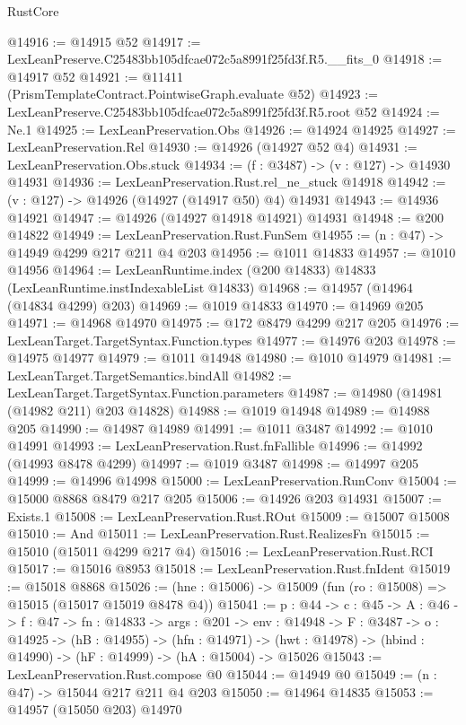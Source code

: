 \begin{lexlean}{RustCore}
\begin{coremodule}
@14916 := @14915 @52
@14917 := LexLeanPreserve.C25483bb105dfcae072c5a8991f25fd3f.R5.__fits_0
@14918 := @14917 @52
@14921 := @11411 (PrismTemplateContract.PointwiseGraph.evaluate @52)
@14923 := LexLeanPreserve.C25483bb105dfcae072c5a8991f25fd3f.R5.root @52
@14924 := Ne.{1}
@14925 := LexLeanPreservation.Obs
@14926 := @14924 @14925
@14927 := LexLeanPreservation.Rel
@14930 := @14926 (@14927 @52 @4)
@14931 := LexLeanPreservation.Obs.stuck
@14934 := (f : @3487) -> (v : @127) -> @14930 @14931
@14936 := LexLeanPreservation.Rust.rel_ne_stuck @14918
@14942 := (v : @127) -> @14926 (@14927 (@14917 @50) @4) @14931
@14943 := @14936 @14921
@14947 := @14926 (@14927 @14918 @14921) @14931
@14948 := @200 @14822
@14949 := LexLeanPreservation.Rust.FunSem
@14955 := (n : @47) -> @14949 @4299 @217 @211 @4 @203
@14956 := @1011 @14833
@14957 := @1010 @14956
@14964 := LexLeanRuntime.index (@200 @14833) @14833 (LexLeanRuntime.instIndexableList @14833)
@14968 := @14957 (@14964 (@14834 @4299) @203)
@14969 := @1019 @14833
@14970 := @14969 @205
@14971 := @14968 @14970
@14975 := @172 @8479 @4299 @217 @205
@14976 := LexLeanTarget.TargetSyntax.Function.types
@14977 := @14976 @203
@14978 := @14975 @14977
@14979 := @1011 @14948
@14980 := @1010 @14979
@14981 := LexLeanTarget.TargetSemantics.bindAll
@14982 := LexLeanTarget.TargetSyntax.Function.parameters
@14987 := @14980 (@14981 (@14982 @211) @203 @14828)
@14988 := @1019 @14948
@14989 := @14988 @205
@14990 := @14987 @14989
@14991 := @1011 @3487
@14992 := @1010 @14991
@14993 := LexLeanPreservation.Rust.fnFallible
@14996 := @14992 (@14993 @8478 @4299)
@14997 := @1019 @3487
@14998 := @14997 @205
@14999 := @14996 @14998
@15000 := LexLeanPreservation.RunConv
@15004 := @15000 @8868 @8479 @217 @205
@15006 := @14926 @203 @14931
@15007 := Exists.{1}
@15008 := LexLeanPreservation.Rust.ROut
@15009 := @15007 @15008
@15010 := And
@15011 := LexLeanPreservation.Rust.RealizesFn
@15015 := @15010 (@15011 @4299 @217 @4)
@15016 := LexLeanPreservation.Rust.RCI
@15017 := @15016 @8953
@15018 := LexLeanPreservation.Rust.fnIdent
@15019 := @15018 @8868
@15026 := (hne : @15006) -> @15009 (fun (ro : @15008) => @15015 (@15017 @15019 @8478 @4))
@15041 := {p : @44} ->
  {c : @45} ->
  {A : @46} ->
  {f : @47} ->
  {fn : @14833} ->
  {args : @201} ->
  {env : @14948} ->
  {F : @3487} ->
  {o : @14925} ->
  (hB : @14955) ->
  (hfn : @14971) -> (hwt : @14978) -> (hbind : @14990) -> (hF : @14999) -> (hA : @15004) -> @15026
@15043 := LexLeanPreservation.Rust.compose @0
@15044 := @14949 @0
@15049 := (n : @47) -> @15044 @217 @211 @4 @203
@15050 := @14964 @14835
@15053 := @14957 (@15050 @203) @14970

\end{coremodule}
\end{lexlean}
